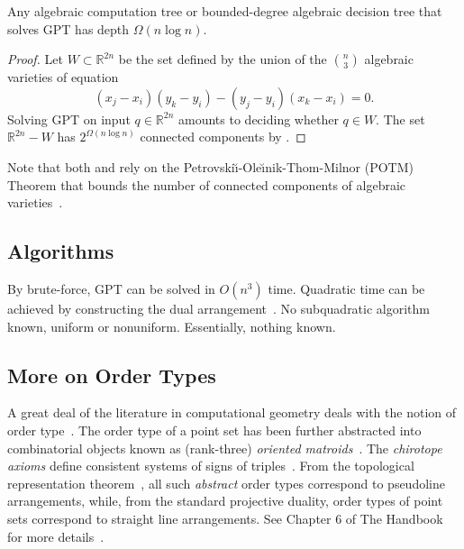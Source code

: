 \begin{corollary}
    Any algebraic computation tree or bounded-degree algebraic decision tree
    that solves GPT has depth \(\Omega(n \log n)\).
\end{corollary}

\begin{proof}
    Let \(W \subset \mathbb{R}^{2n}\) be the set defined by the union of the
    \(n \choose 3\) algebraic varieties of equation
    \begin{displaymath}
	(x_j - x_i)(y_k - y_i) - (y_j - y_i)(x_k - x_i) = 0.
    \end{displaymath}
    Solving GPT on input \(q \in \mathbb{R}^{2n}\)
    amounts to deciding whether \(q \in W\).
    The set \(\mathbb{R}^{2n} - W\) has \(2^{\Omega(n \log n)}\) connected
    components by
    .
\end{proof}

Note that both
and
 rely on
the
Petrovski\u{\i}-Ole\u{\i}nik-Thom-Milnor (POTM) Theorem that
bounds the number of connected components of
algebraic varieties~\cite{Mi64,Th65,BPR06}.


\subsection{Algorithms}%
\label{sec:problem:pol:algorithms}

By brute-force, GPT can be solved in \(O(n^3)\) time.
%
Quadratic time can be achieved by constructing the dual
arrangement~\cite[Theorem 24.4.1]{Hal04}.
%
No subquadratic algorithm known, uniform or nonuniform.
%
Essentially, nothing known.


\subsection{More on Order Types}%
\label{sec:problem:pol:order-types}

A great deal of the literature in computational geometry deals with the notion
of order type~\cite{%
AAK02a,
AAK02b,
ACKLV16,
AKPV14,
AK01,
AK05,
AKMPW15,
AMP13,
Al86,
AILOW14,
BLSWZ93,
BMS01,
BRS92,
Epp18,
EHN99,
Fe96,
FV11,
FL78,
Go80,
GP83,
GP84,
GP86,
GP91,
GP93,
GPS89,
HM94,
HMMS11,
Knu92,
Le26,
MMIB12,
NV98,
Ri89,
RZ04,
Ri56,
St97%
}.
The order type of a point set has been further abstracted into combinatorial
objects known as (rank-three) \emph{oriented matroids}~\cite{FL78}. The
\emph{chirotope axioms} define consistent systems of signs of
triples~\cite{BLSWZ93}.
%
From the topological representation theorem~\cite{BMS01}, all such
\emph{abstract} order types correspond to pseudoline arrangements, while, from
the standard projective duality, order types of point sets correspond to
straight line arrangements. See Chapter 6 of The Handbook for more
details~\cite{RZ04}.

